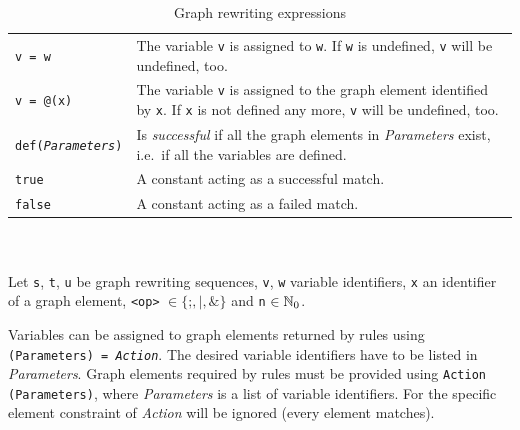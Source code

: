 \begin{table}[htbp]
\begin{minipage}{\linewidth}
\begin{tabularx}{\linewidth}{|lX|}
\texttt{v = w}	& The variable \texttt{v} is assigned to \texttt{w}. If \texttt{w} is undefined, \texttt{v} will be undefined, too.\\
\texttt{v = @(x)}	& The variable \texttt{v} is assigned to the graph element identified by \texttt{x}. If \texttt{x} is not defined any more, \texttt{v} will be undefined, too.\\
\texttt{def(\emph{Parameters})} & Is \emph{successful} if all the graph elements in \emph{Parameters} exist, i.e.\ if all the variables are defined.\\
\texttt{true}	& A constant acting as a successful match.\\
\texttt{false}	& A constant acting as a failed match.\\ \hline
\end{tabularx}\indexmain{\texttt{;}}
\indexmain{\texttt{\&}}\indexmain{\texttt{*}}
\end{minipage}\\
\\ 
{\small Let \texttt{s}, \texttt{t}, \texttt{u} be graph rewriting sequences, \texttt{v}, \texttt{w} variable identifiers, \texttt{x} an identifier of a graph element, \texttt{<op>} $\in \{\texttt{;}, \texttt{|}, \texttt{\&}\}$ and \texttt{n} $\in \mathbb{N}_0$.}
\caption{Graph rewriting expressions}
\label{ruletab}
\end{table}
\makeatother

Variables can be assigned to graph elements returned by rules using \texttt{(Para\-meters) = \emph{Action}}. 
The desired variable identifiers have to be listed in \emph{Parameters}. 
Graph elements required by rules must be provided using \texttt{Action (Para\-meters)}, where \emph{Parameters} is a list of variable identifiers. 
For  the specific element constraint of \emph{Action} will be ignored (every element matches).\\

